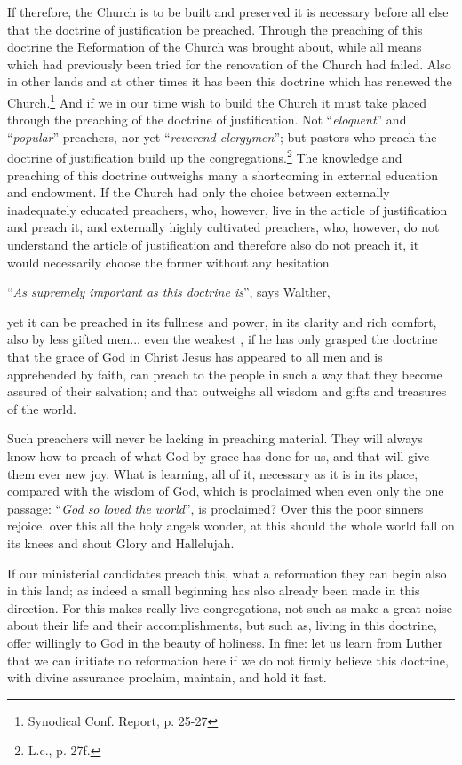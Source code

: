                 If therefore, the Church is to be built and preserved it is necessary before all else that the doctrine of justification be preached.  Through the preaching of this doctrine the Reformation of the Church was brought about, while all means which had previously been tried for the renovation of the Church had failed.  Also in other lands and at other times it has been this doctrine which has renewed the Church.\footnote{Synodical Conf. Report, p. 25-27}  And if we in our time wish to build the Church it must take placed through the preaching of the doctrine of justification.  Not “\textit{eloquent}” and “\textit{popular}” preachers, nor yet “\textit{reverend clergymen}”; but pastors who preach the doctrine of justification build up the congregations.\footnote{L.c., p. 27f.}  The knowledge and preaching of this doctrine outweighs many a shortcoming in external education and endowment.  If the Church had only the choice between externally inadequately educated preachers, who, however, live in the article of justification and preach it, and externally highly cultivated preachers, who, however, do not understand the article of justification and therefore also do not preach it, it would necessarily choose the former without any hesitation.  \par “\textit{As supremely important as this doctrine is}”, says Walther, \begin{fancyquotes}yet it can be preached in its fullness and power, in its clarity and rich comfort, also by less gifted men... even the weakest , if he has only grasped the doctrine that the grace of God in Christ Jesus has appeared to all men and is apprehended by faith, can preach to the people in such a way that they become assured of their salvation; and that outweighs all wisdom and gifts and treasures of the world.\par  Such preachers will never be lacking in preaching material.  They will always know how to preach of what God by grace has done for us, and that will give them ever new joy.  What is learning, all of it, necessary as it is in its place, compared with the wisdom of God, which is proclaimed when even only the one passage: “\textit{God so loved the world}”, is proclaimed?  Over this the poor sinners rejoice, over this all the holy angels wonder, at this should the whole world fall on its knees and shout Glory and Hallelujah.  \par If our ministerial candidates preach this, what a reformation they can begin also in this land; as indeed a small beginning has also already been made in this direction.  For this makes really live congregations, not such as make a great noise about their life and their accomplishments, but such as, living in this doctrine, offer willingly to God in the beauty of holiness.  In fine: let us learn from Luther that we can initiate no reformation here if we do not firmly believe this doctrine, with divine assurance proclaim, maintain, and hold it fast.\end{fancyquotes}

